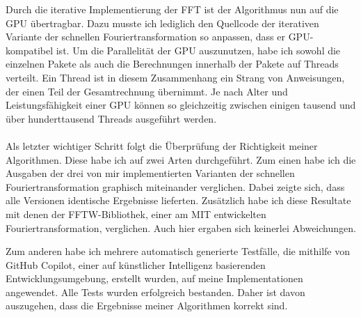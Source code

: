 \documentclass[a4paper,12pt]{article}
\theoremstyle{definition}
\theoremstyle{remark}
\begin{document}
Durch die iterative Implementierung der FFT ist der Algorithmus nun auf die GPU übertragbar. Dazu musste ich lediglich den Quellcode 
der iterativen Variante der schnellen Fouriertransformation so anpassen, dass er GPU-kompatibel ist. Um die Parallelität der GPU 
auszunutzen, habe ich sowohl die einzelnen Pakete als auch die Berechnungen innerhalb der Pakete auf Threads verteilt. Ein Thread ist 
in diesem Zusammenhang ein Strang von Anweisungen, der einen Teil der Gesamtrechnung übernimmt. Je nach Alter und Leistungsfähigkeit 
einer GPU können so gleichzeitig zwischen einigen tausend und über hunderttausend Threads ausgeführt werden.
\\\\
Als letzter wichtiger Schritt folgt die Überprüfung der Richtigkeit meiner Algorithmen. Diese habe ich auf zwei Arten durchgeführt.
Zum einen habe ich die Ausgaben der drei von mir implementierten Varianten der schnellen Fouriertransformation graphisch miteinander 
verglichen. Dabei zeigte sich, dass alle Versionen identische Ergebnisse lieferten. Zusätzlich habe ich diese Resultate mit denen der 
FFTW-Bibliothek, einer am MIT entwickelten Fouriertransformation, verglichen. Auch hier ergaben sich keinerlei 
Abweichungen.

Zum anderen habe ich mehrere automatisch generierte Testfälle, die mithilfe von GitHub Copilot, einer auf künstlicher Intelligenz 
basierenden Entwicklungsumgebung, erstellt wurden, auf meine Implementationen angewendet. Alle Tests wurden erfolgreich bestanden. 
Daher ist davon auszugehen, dass die Ergebnisse meiner Algorithmen korrekt sind.
\end{document}
